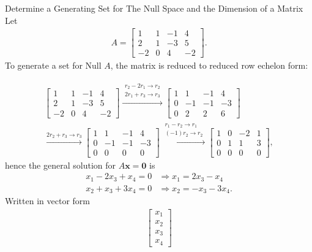 \begin{example}{Determine a Generating Set for The Null Space and the Dimension of a Matrix }
Let
\begin{align*}
    A=
    \begin{bmatrix}
    1 & 1 & -1 & 4 \\
    2 & 1 & -3 & 5\\
    -2 & 0 & 4 & -2
    \end{bmatrix}.
\end{align*}
To generate a set for Null $A$, the matrix is reduced to reduced row echelon form:

\begin{align*}
\begin{bmatrix}
    1 & 1 & -1 & 4 \\
    2 & 1 & -3 & 5\\
    -2 & 0 & 4 & -2
\end{bmatrix}\xrightarrow{\substack{r_2-2r_1\rightarrow r_2\\2r_1+r_3\rightarrow r_3}}
\begin{bmatrix}
    1 & 1 & -1 & 4 \\
    0 & -1 & -1 & -3\\
    0 & 2 & 2 & 6
\end{bmatrix}\\\xrightarrow{2r_2+r_3\rightarrow r_3}
\begin{bmatrix}
   1 & 1 & -1 & 4 \\
    0 & -1 & -1 & -3\\
    0 & 0 & 0 & 0 
\end{bmatrix}
\xrightarrow{\substack{r_1-r_2\rightarrow r_1\\(-1)r_2\rightarrow r_2}}
\begin{bmatrix}
   1 & 0 & -2 & 1 \\
    0 & 1 & 1 & 3\\
    0 & 0 & 0 & 0
\end{bmatrix},
\end{align*}
hence the general solution for $A\textbf{x}=\textbf{0}$ is
\begin{align*}
    x_1 - 2x_3 + x_4 = 0 &\Rightarrow x_1 = 2x_3 - x_4\\
    x_2 + x_3 + 3x_4 = 0 &\Rightarrow x_2=-x_3 -3x_4.
\end{align*}
Written in vector form
\begin{align*}
\begin{bmatrix}
   x_1\\x_2\\x_3\\x_4 

\end{bmatrix}
\end{align*}
\end{example}

